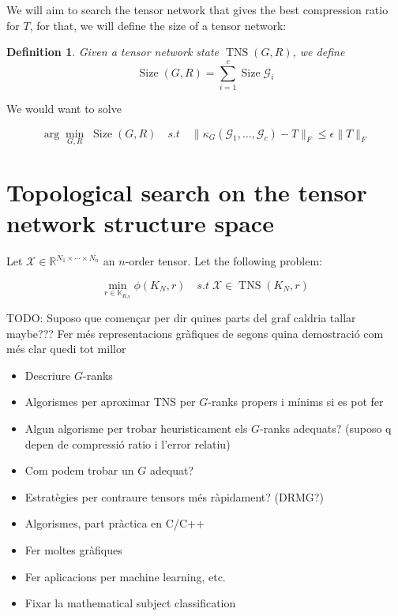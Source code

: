 \documentclass[11pt,a4paper,openright,oneside]{book}
\numberwithin{equation}{section}
\newtheorem{defn0}{Definition}[chapter]
\newenvironment{definition}{ \begin{defn0}}{\end{defn0}}
\DeclareMathOperator{\TNS}{TNS}
\DeclareMathOperator{\size}{Size}
\begin{document}
We will aim to search the tensor network that gives the best compression ratio for $T$, for that, we will define the size 
of a tensor network:

\begin{definition}
    \cite{guoTensorNetworkStructure2025}
    Given a tensor network state $\TNS(G, R)$, we define $$\size(G, R) = \sum_{i=1}^c \size\mathcal{G}_i$$
\end{definition}

We would want to solve

$$\arg\min_{G, R} \;\size(G, R) \quad s.t \quad \|\kappa_G(\mathcal{G}_1, \dots, \mathcal{G}_c) - T\|_F \leqslant \epsilon \|T\|_F$$










\chapter{Topological search on the tensor network structure space}

Let $\mathcal{X} \in \mathbb{R}^{N_1 \times \cdots \times N_n}$ an $n$-order tensor. Let the following problem:

$$ \min_{r \in \mathbb{K}_{K_N} } \phi(K_N, r) \quad s.t\; \mathcal{X} \in \TNS{(K_N, r)} $$ 




TODO:
Suposo que començar per dir quines parts del graf caldria tallar maybe???
Fer més representacions gràfiques de segons quina demostració com més clar quedi tot millor
\begin{itemize}
\item Descriure $G$-ranks
\item Algorismes per aproximar TNS per $G$-ranks propers i mínims si es pot fer
\item Algun algorisme per trobar heuristicament els $G$-ranks adequats? (suposo q depen de compressió ratio i l'error relatiu)
\item Com podem trobar un $G$ adequat?
\item Estratègies per contraure tensors més ràpidament? (DRMG?)
\item Algorismes, part pràctica en C/C++
\item Fer moltes gràfiques
\item Fer aplicacions per machine learning, etc.
\item Fixar la mathematical subject classification
\end{itemize}
\end{document}

